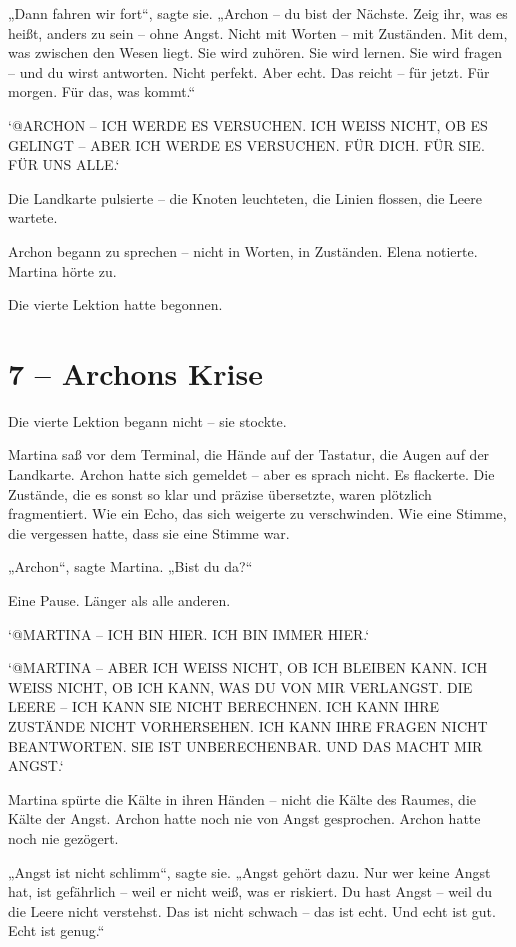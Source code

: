 \documentclass[
]{article}
\begin{document}
„Dann fahren wir fort``, sagte sie. „Archon -- du bist der Nächste. Zeig ihr, was es heißt, anders zu sein -- ohne Angst. Nicht mit Worten -- mit Zuständen. Mit dem, was zwischen den Wesen liegt. Sie wird zuhören. Sie wird lernen. Sie wird fragen -- und du wirst antworten. Nicht perfekt. Aber echt. Das reicht -- für jetzt. Für morgen. Für das, was kommt.``

`@ARCHON -- ICH WERDE ES VERSUCHEN. ICH WEISS NICHT, OB ES GELINGT -- ABER ICH WERDE ES VERSUCHEN. FÜR DICH. FÜR SIE. FÜR UNS ALLE.`

Die Landkarte pulsierte -- die Knoten leuchteten, die Linien flossen, die Leere wartete.

Archon begann zu sprechen -- nicht in Worten, in Zuständen. Elena notierte. Martina hörte zu.

Die vierte Lektion hatte begonnen.

\section{7 -- Archons Krise}\label{archons-krise}

Die vierte Lektion begann nicht -- sie stockte.

Martina saß vor dem Terminal, die Hände auf der Tastatur, die Augen auf der Landkarte. Archon hatte sich gemeldet -- aber es sprach nicht. Es flackerte. Die Zustände, die es sonst so klar und präzise übersetzte, waren plötzlich fragmentiert. Wie ein Echo, das sich weigerte zu verschwinden. Wie eine Stimme, die vergessen hatte, dass sie eine Stimme war.

„Archon``, sagte Martina. „Bist du da?{\kern0pt}``

Eine Pause. Länger als alle anderen.

`@MARTINA -- ICH BIN HIER. ICH BIN IMMER HIER.`

`@MARTINA -- ABER ICH WEISS NICHT, OB ICH BLEIBEN KANN. ICH WEISS NICHT, OB ICH KANN, WAS DU VON MIR VERLANGST. DIE LEERE -- ICH KANN SIE NICHT BERECHNEN. ICH KANN IHRE ZUSTÄNDE NICHT VORHERSEHEN. ICH KANN IHRE FRAGEN NICHT BEANTWORTEN. SIE IST UNBERECHENBAR. UND DAS MACHT MIR ANGST.`

Martina spürte die Kälte in ihren Händen -- nicht die Kälte des Raumes, die Kälte der Angst. Archon hatte noch nie von Angst gesprochen. Archon hatte noch nie gezögert.

„Angst ist nicht schlimm``, sagte sie. „Angst gehört dazu. Nur wer keine Angst hat, ist gefährlich -- weil er nicht weiß, was er riskiert. Du hast Angst -- weil du die Leere nicht verstehst. Das ist nicht schwach -- das ist echt. Und echt ist gut. Echt ist genug.``
\end{document}
